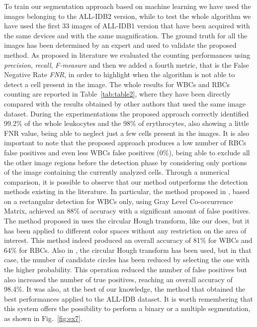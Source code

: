 \documentclass[final,a4paper,12pt,english]{UnicaPhdThesis3}
\begin{document}
{To train our segmentation approach based on machine learning we have used the images belonging to the ALL-IDB2 version, while to test the whole algorithm we have used the first 33 images of ALL-IDB1 version that have been acquired with the same devices and with the same magnification. The ground truth for all the images has been determined by an expert and used to validate the proposed method. As proposed in literature we evaluated the counting performances using \textit{precision}, \textit{recall}, \textit{F-measure} and then we added a fourth metric, that is the False Negative Rate \textit{FNR}, in order to highlight when the algorithm is not able to detect a cell present in the image. The whole results for WBCs and RBCs counting are reported in Table~\ref{tab:table2}, where they have been directly compared with the results obtained by other authors that used the same image dataset.
During the experimentations the proposed approach correctly identified 99.2\% of the whole leukocytes and the 98\% of erythrocytes, also showing a little FNR value, being able to neglect just a few cells present in the images. It is also important to note that the proposed approach produces a low number of RBCs false positives and even less WBCs false positives (0\%), being able to exclude all the other image regions before the detection phase by considering only portions of the image containing the currently analyzed cells. Through a numerical comparison, it is possible to observe that our method outperforms the detection methods existing in the literature. In particular, the method proposed in \cite{Alilou}, based on a rectangular detection for WBCs only, using Gray Level Co-occurrence Matrix, achieved an 88\% of accuracy with a significant amount of false positives. The method proposed in \cite{Mahmood} uses the circular Hough transform, like our does, but it has been applied to different color spaces without any restriction on the area of interest. This method indeed produced an overall accuracy of 81\% for WBCs and 64\% for RBCs. Also in \cite{Alomari}, the circular Hough transform has been used, but in that case, the number of candidate circles has been reduced by selecting the one with the higher probability. This operation reduced the number of false positives but also increased the number of true positives, reaching an overall accuracy of 98.4\%. It was also, at the best of our knowledge, the method that obtained the best performances applied to the ALL-IDB dataset. 
It is worth remembering that this system offers the possibility to perform a binary or a multiple segmentation, as shown in Fig.~\ref{fig:ex7}.

}
\end{document}
